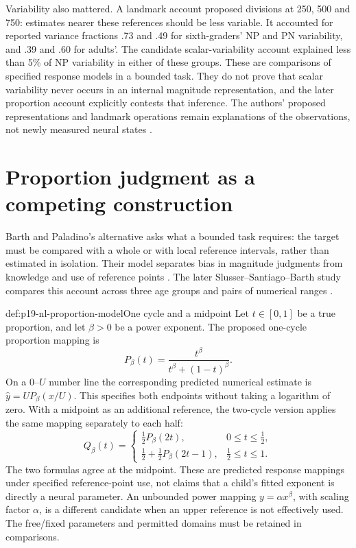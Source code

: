 Variability also mattered. A landmark account proposed divisions at
250, 500 and 750: estimates nearer these references should be less
variable. It accounted for reported variance fractions .73 and .49
for sixth-graders' NP and PN variability, and .39 and .60 for adults'.
The candidate scalar-variability account explained less than 5\% of
NP variability in either of these groups. These are comparisons of
specified response models in a bounded task. They do not prove that
scalar variability never occurs in an internal magnitude representation,
and the later proportion account explicitly contests that inference.
The authors' proposed representations and landmark operations remain
explanations of the observations, not newly measured neural states
\cite[p.~242]{SieglerOpfer2003EstimationNL}.

\section{Proportion judgment as a competing construction}
\label{sec:p19-nl-proportion}

Barth and Paladino's alternative asks what a bounded task requires:
the target must be compared with a whole or with local reference
intervals, rather than estimated in isolation. Their model separates
bias in magnitude judgments from knowledge and use of reference
points \cite[pp.~125--127]{BarthPaladino2011ProportionNL}.
The later Slusser--Santiago--Barth study compares this account across
three age groups and pairs of numerical ranges
\cite[pp.~3--6 of the online-first article]
{SlusserEtAl2012OnlineProportionNL}.

\begin{hbdefinition}{def:p19-nl-proportion-model}{One cycle and a midpoint}
Let \(t\in[0,1]\) be a true proportion, and let \(\beta>0\)
be a power exponent. The proposed one-cycle proportion mapping is
\[
 P_\beta(t)=\frac{t^\beta}{t^\beta+(1-t)^\beta}.
\]
On a 0--\(U\) number line the corresponding predicted numerical
estimate is \(\widehat y=U P_\beta(x/U)\).
This specifies both endpoints without taking a logarithm of zero.
With a midpoint as an additional reference, the two-cycle version
applies the same mapping separately to each half:
\[
 Q_\beta(t)=
 \begin{cases}
   \tfrac12P_\beta(2t),&0\leq t\leq\tfrac12,\\
   \tfrac12+\tfrac12P_\beta(2t-1),&\tfrac12\leq t\leq1.
 \end{cases}
\]
The two formulas agree at the midpoint. These are predicted
response mappings under specified reference-point use, not claims
that a child's fitted exponent is directly a neural parameter.
An unbounded power mapping \(y=\alpha x^\beta\), with scaling
factor \(\alpha\), is a different candidate when an upper reference
is not effectively used. The free/fixed parameters and permitted
domains must be retained in comparisons.
\end{hbdefinition}

